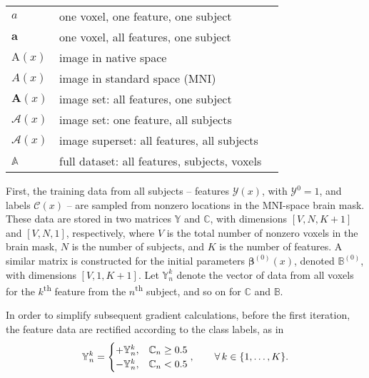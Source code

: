 \documentclass[openany,11pt,vi,oneside]{mitthesis}
\newcommand{\bb}{\bm{\beta}}
\newcommand{\Y}{\mathcal{Y}}
\newcommand{\C}{\mathcal{C}}
\newcommand{\x}[1]{\mathbb{#1}}
\renewcommand{\ss}[1]{\textsuperscript{#1}}
\newcommand{\et}{\thinspace}
\begin{document}
\begin{singlespace}
\begin{table}[H]
\begin{tabular}{lll}
  	$a$                   & one voxel, one feature, one subject                  &                      \\
  	$\bm{a}$              & one voxel, all features, one subject                 &                      \\
  	$\mathrm{A}(x)$       & image in native space                                &                      \\
  	$A(x)$                & image in standard space (MNI)                        &                      \\
  	$\bm{A}(x)$           & image set: all features, one subject                 &                      \\
  	$\mathcal{A}(x)$      & image set: one feature, all subjects                 &                      \\
  	$\bm{\mathcal{A}}(x)$ & image superset: all features, all subjects           &                      \\ 
    $\x{A}$               & full dataset: all features, subjects, voxels         &                      \\ \hline
  \end{tabular}
\end{table}
\end{singlespace}
\clearpage
First, the training data from all subjects -- features $\bm{\Y}(x)$, with $\Y^0=1$, and labels $\C(x)$ -- are sampled from nonzero locations in the MNI-space brain mask. These data are stored in two matrices $\x{Y}$ and $\x{C}$, with dimensions $[V,N,K+1]$ and $[V,N,1]$, respectively, where $V$ is the total number of nonzero voxels in the brain mask, $N$ is the number of subjects, and $K$ is the number of features. A similar matrix is constructed for the initial parameters $\bb^{(0)}(x)$, denoted $\x{B}^{(0)}$, with dimensions $[V,1,K+1]$. Let $\x{Y}_n^k$ denote the vector of data from all voxels for the $k$\ss{th} feature from the $n$\ss{th} subject, and so on for $\x{C}$ and $\x{B}$.
\par
In order to simplify subsequent gradient calculations, before the first iteration, the feature data are rectified according to the class labels, as in
\begin{equation}
\x{Y}_n^k =
\begin{cases}
+\x{Y}_n^k, & \x{C}_n \ge 0.5\\
-\x{Y}_n^k, & \x{C}_n <  0.5\\
\end{cases},\qquad\forall\et k \in \{1,\dots,K\}.
\end{equation}
\end{document}
